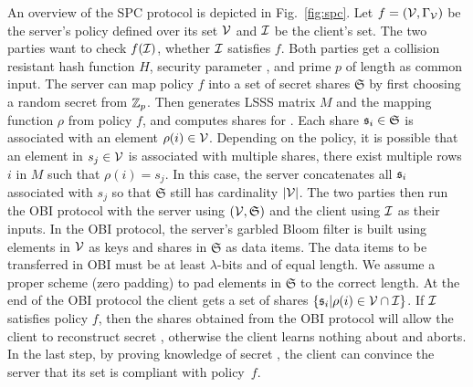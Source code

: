 An overview of the \ac{SPC} protocol is depicted in Fig.~\ref{fig:spc}. 
Let $f=(\mathcal{V},\Gamma_\mathcal{V})$ be the server's policy defined over its set $\mathcal{V}$ and $\mathcal{I}$ be the client's set. 
The two parties want to check $f(\mathcal{I})$, \ie whether $\mathcal{I}$ satisfies $f$. 
Both parties get a collision resistant hash function $H$, security parameter \secpar, and prime $p$ of length \secpar as common input. 
The server can map policy $f$ into a set of secret shares $\mathfrak{S}$ by first choosing a random secret \secret from $\mathbb{Z}_p$.
Then \Server generates \ac{LSSS} matrix $M$ and the mapping function $\rho$ from policy $f$, and computes shares for \secret. 
Each share $\mathfrak{s}_i \in \mathfrak{S}$ is associated with an element $\rho(i)\in \mathcal{V}$. 
Depending on the policy, it is possible that an element in $s_j\in\mathcal{V}$ is associated with multiple shares, \ie there exist multiple rows $i$ in $M$ such that $\rho(i)=s_j$. 
In this case, the server concatenates all $\mathfrak{s}_i$ associated with $s_j$ so that $\mathfrak{S}$ still has cardinality $|\mathcal{V}|$. 
The two parties then run the \ac{OBI} protocol with the server using $(\mathcal{V}, \mathfrak{S})$ and the client using $\mathcal{I}$ as their inputs. 
In the \ac{OBI} protocol, the server's garbled Bloom filter is built using elements in $\mathcal{V}$ as keys and shares in $\mathfrak{S}$ as data items.
The data items to be transferred in \ac{OBI} must be at least $\lambda$-bits and of equal length. 
We assume a proper scheme (\eg zero padding) to pad elements in $\mathfrak{S}$ to the correct length.
At the end of the \ac{OBI} protocol the client gets a set of shares $\{\mathfrak{s}_i|\rho(i)\in \mathcal{V}\cap \mathcal{I}\}$. 
If $\mathcal{I}$ satisfies policy $f$, then the shares obtained from the \ac{OBI} protocol will allow the client to reconstruct secret \secret, otherwise the client learns nothing about \secret and aborts. 
In the last step, by proving knowledge of secret \secret, the client can convince the server that its set is compliant with policy~$f$.



